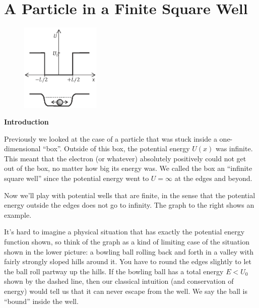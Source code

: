 \section{A Particle in a Finite Square Well}

\makelabheader %

\bigskip

\begin{figure}
\begin{center}
\vspace{-0.1in}
\includegraphics[width=0.34\textwidth]{particle_in_finite_well/finite_potential.eps}
\end{center}
\end{figure}

\textbf{Introduction}

Previously we looked at the case of a particle that was stuck inside a one-dimensional ``box''. 
Outside of this box, the potential energy $U(x)$ was infinite. This meant that the electron (or whatever) absolutely positively could not get out of the box, no matter how big its energy was. 
We called the box an ``infinite square well'' since the potential energy went to $U=\infty$ at the edges and beyond.

Now we'll play with potential wells that are finite, in the sense that the potential energy outside the edges does not go to infinity. The graph to the right shows an example.

It's hard to imagine a physical situation that has exactly the potential energy function shown, so think of the graph as a kind of limiting case of the situation shown in the lower picture: a bowling ball rolling back and forth in a valley with fairly strongly sloped hills around it.  You have to round the edges slightly to let the ball roll partway up the hills.  If the bowling ball has a total energy $E<U_0$ shown by the dashed line, then our classical intuition (and conservation of energy) would tell us that it can never escape from the well.  We say the ball is ``bound'' inside the well.

